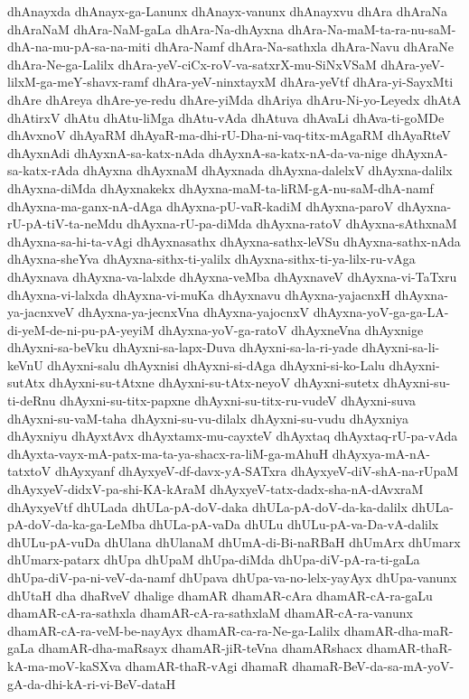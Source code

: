 {dhAnayxda
dhAnayx-ga-Lanunx
dhAnayx-vanunx
dhAnayxvu
dhAra
dhAraNa
dhAraNaM
dhAra-NaM-gaLa
dhAra-Na-dhAyxna
dhAra-Na-maM-ta-ra-nu-saM-dhA-na-mu-pA-sa-na-miti
dhAra-Namf
dhAra-Na-sathxla
dhAra-Navu
dhAraNe
dhAra-Ne-ga-Lalilx
dhAra-yeV-ciCx-roV-va-satxrX-mu-SiNxVSaM
dhAra-yeV-lilxM-ga-meY-shavx-ramf
dhAra-yeV-ninxtayxM
dhAra-yeVtf
dhAra-yi-SayxMti
dhAre
dhAreya
dhAre-ye-redu
dhAre-yiMda
dhAriya
dhAru-Ni-yo-Leyedx
dhAtA
dhAtirxV
dhAtu
dhAtu-liMga
dhAtu-vAda
dhAtuva
dhAvaLi
dhAva-ti-goMDe
dhAvxnoV
dhAyaRM
dhAyaR-ma-dhi-rU-Dha-ni-vaq-titx-mAgaRM
dhAyaRteV
dhAyxnAdi
dhAyxnA-sa-katx-nAda
dhAyxnA-sa-katx-nA-da-va-nige
dhAyxnA-sa-katx-rAda
dhAyxna
dhAyxnaM
dhAyxnada
dhAyxna-dalelxV
dhAyxna-dalilx
dhAyxna-diMda
dhAyxnakekx
dhAyxna-maM-ta-liRM-gA-nu-saM-dhA-namf
dhAyxna-ma-ganx-nA-dAga
dhAyxna-pU-vaR-kadiM
dhAyxna-paroV
dhAyxna-rU-pA-tiV-ta-neMdu
dhAyxna-rU-pa-diMda
dhAyxna-ratoV
dhAyxna-sAthxnaM
dhAyxna-sa-hi-ta-vAgi
dhAyxnasathx
dhAyxna-sathx-leVSu
dhAyxna-sathx-nAda
dhAyxna-sheYva
dhAyxna-sithx-ti-yalilx
dhAyxna-sithx-ti-ya-lilx-ru-vAga
dhAyxnava
dhAyxna-va-lalxde
dhAyxna-veMba
dhAyxnaveV
dhAyxna-vi-TaTxru
dhAyxna-vi-lalxda
dhAyxna-vi-muKa
dhAyxnavu
dhAyxna-yajacnxH
dhAyxna-ya-jacnxveV
dhAyxna-ya-jecnxVna
dhAyxna-yajocnxV
dhAyxna-yoV-ga-ga-LA-di-yeM-de-ni-pu-pA-yeyiM
dhAyxna-yoV-ga-ratoV
dhAyxneVna
dhAyxnige
dhAyxni-sa-beVku
dhAyxni-sa-lapx-Duva
dhAyxni-sa-la-ri-yade
dhAyxni-sa-li-keVnU
dhAyxni-salu
dhAyxnisi
dhAyxni-si-dAga
dhAyxni-si-ko-Lalu
dhAyxni-sutAtx
dhAyxni-su-tAtxne
dhAyxni-su-tAtx-neyoV
dhAyxni-sutetx
dhAyxni-su-ti-deRnu
dhAyxni-su-titx-papxne
dhAyxni-su-titx-ru-vudeV
dhAyxni-suva
dhAyxni-su-vaM-taha
dhAyxni-su-vu-dilalx
dhAyxni-su-vudu
dhAyxniya
dhAyxniyu
dhAyxtAvx
dhAyxtamx-mu-cayxteV
dhAyxtaq
dhAyxtaq-rU-pa-vAda
dhAyxta-vayx-mA-patx-ma-ta-ya-shacx-ra-liM-ga-mAhuH
dhAyxya-mA-nA-tatxtoV
dhAyxyanf
dhAyxyeV-df-davx-yA-SATxra
dhAyxyeV-diV-shA-na-rUpaM
dhAyxyeV-didxV-pa-shi-KA-kAraM
dhAyxyeV-tatx-dadx-sha-nA-dAvxraM
dhAyxyeVtf
dhULada
dhULa-pA-doV-daka
dhULa-pA-doV-da-ka-dalilx
dhULa-pA-doV-da-ka-ga-LeMba
dhULa-pA-vaDa
dhULu
dhULu-pA-va-Da-vA-dalilx
dhULu-pA-vuDa
dhUlana
dhUlanaM
dhUmA-di-Bi-naRBaH
dhUmArx
dhUmarx
dhUmarx-patarx
dhUpa
dhUpaM
dhUpa-diMda
dhUpa-diV-pA-ra-ti-gaLa
dhUpa-diV-pa-ni-veV-da-namf
dhUpava
dhUpa-va-no-lelx-yayAyx
dhUpa-vanunx
dhUtaH
dha
dhaRveV
dhalige
dhamAR
dhamAR-cAra
dhamAR-cA-ra-gaLu
dhamAR-cA-ra-sathxla
dhamAR-cA-ra-sathxlaM
dhamAR-cA-ra-vanunx
dhamAR-cA-ra-veM-be-nayAyx
dhamAR-ca-ra-Ne-ga-Lalilx
dhamAR-dha-maR-gaLa
dhamAR-dha-maRsayx
dhamAR-jiR-teVna
dhamARshacx
dhamAR-thaR-kA-ma-moV-kaSXva
dhamAR-thaR-vAgi
dhamaR
dhamaR-BeV-da-sa-mA-yoV-gA-da-dhi-kA-ri-vi-BeV-dataH
}
